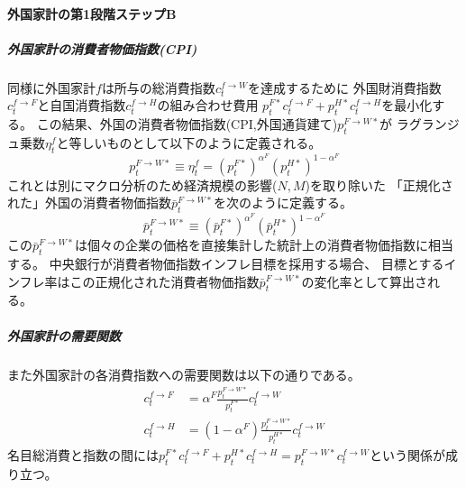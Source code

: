 \paragraph{外国家計の第1段階ステップB}
\label{sec:model_households_indices_aggregation_stage1b_foreign}

\subparagraph{外国家計の消費者物価指数(CPI)}
同様に外国家計\(f\)は所与の総消費指数\(c_t^{f\to W}\)を達成するために
外国財消費指数\(c_t^{f\to F}\)と自国消費指数\(c_t^{f\to H}\)の組み合わせ費用
\(p_t^{F*}c_t^{f\to F}+p_t^{H*}c_t^{f\to H}\)を最小化する。
この結果、外国の消費者物価指数(CPI,外国通貨建て)\(p_t^{F\to W*}\)が
ラグランジュ乗数\(\eta_t^f\)と等しいものとして以下のように定義される。
\begin{equation}
\label{form:model_households_indices_aggregation_stage1b_foreign_p_F_W_star_def}
    p_t^{F\to W*}\equiv\eta_t^f=(p_t^{F*})^{\alpha^F}(p_t^{H*})^{1-\alpha^F}
\end{equation}
これとは別にマクロ分析のため経済規模の影響(\(N,M\))を取り除いた
「正規化された」外国の消費者物価指数\(\bar{p}_t^{F\to W*}\)を次のように定義する。
\begin{equation}
\label{form:model_households_indices_aggregation_stage1b_foreign_p_F_W_star_bar_def}
    \bar{p}_t^{F\to W*}\equiv(\bar{p}_t^{F*})^{\alpha^F}(\bar{p}_t^{H*})^{1-\alpha^F}
\end{equation}
この\(\bar{p}_t^{F\to W*}\)は個々の企業の価格を直接集計した統計上の消費者物価指数に相当する。
中央銀行が消費者物価指数インフレ目標を採用する場合、
目標とするインフレ率はこの正規化された消費者物価指数\(\bar{p}_t^{F\to W*}\)の変化率として算出される。

\subparagraph{外国家計の需要関数}
また外国家計の各消費指数への需要関数は以下の通りである。
\begin{align}
    \label{form:model_households_indices_aggregation_stage1b_foreign_c_f_F_eq}
        c_t^{f\to F}&=\alpha^F\frac{p_t^{F\to W*}}{p_t^{F*}}c_t^{f\to W} \\
    \label{form:model_households_indices_aggregation_stage1b_foreign_c_f_H_eq}
        c_t^{f\to H}&=(1-\alpha^F) \frac{p_t^{F\to W*}}{p_t^{H*}}c_t^{f\to W}
\end{align}
名目総消費と指数の間には\(p_t^{F*}c_t^{f\to F}+p_t^{H*}c_t^{f\to H}=p_t^{F\to W*}c_t^{f\to W}\)という関係が成り立つ。